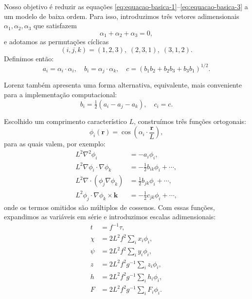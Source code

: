Nosso objetivo é reduzir as equações \eqref{eq:equacao-basica-1}–\eqref{eq:equacao-basica-3} a um modelo de baixa ordem. Para isso, introduzimos três vetores adimensionais $\alpha_1, \alpha_2, \alpha_3$ que satisfazem
\begin{equation*}
	\alpha_1 + \alpha_2 + \alpha_3 = 0,
\end{equation*}
e adotamos as permutações cíclicas
\begin{equation*}
	(i,j,k) = (1,2,3),\; (2,3,1),\; (3,1,2).
\end{equation*}
Definimos então:
\begin{equation*}
	a_i = \alpha_i \cdot \alpha_i, 
	\quad b_i = \alpha_j \cdot \alpha_k, 
	\quad c = (b_1b_2+b_2b_3+b_3b_1)^{1/2}.
\end{equation*}

Lorenz também apresenta uma forma alternativa, equivalente, mais conveniente para a implementação computacional:
\begin{equation*}
	b_i = \tfrac{1}{2}(a_i - a_j - a_k), 
	\quad c_i = c.
\end{equation*}

Escolhido um comprimento característico $L$, construímos três funções ortogonais:
\begin{equation*}
	\phi_i(\mathbf{r}) = \cos\!\left(\alpha_i \cdot \frac{\mathbf{r}}{L}\right),
\end{equation*}
para as quais valem, por exemplo:
\begin{align*}
	L^2\nabla^2\phi_i                              & = -a_i\phi_i,                         \\
	L^2\nabla\phi_i \cdot \nabla\phi_k             & = -\tfrac{1}{2}b_{ik}\phi_i + \cdots, \\
	L^2\nabla \cdot (\phi_j\nabla\phi_k)           & = \tfrac{1}{2}b_{jk}\phi_i + \cdots,  \\
	L^2\phi_j \cdot \nabla\phi_k \times \mathbf{k} & = -\tfrac{1}{2}c_{jk}\phi_i + \cdots, 
\end{align*}
onde os termos omitidos são múltiplos de cossenos. Com essas funções, expandimos as variáveis em série e introduzimos escalas adimensionais:
\begin{equation}\label{eq:ch01-adimensionalizacao}
    \begin{aligned}
    	t    & = f^{-1}\tau,                     \\
    	\chi & = 2L^2f^2 \sum_i x_i\phi_i,       \\
    	\psi & = 2L^2f^2 \sum_i y_i\phi_i,       \\
    	z    & = 2L^2f^2g^{-1} \sum_i z_i\phi_i, \\
    	h    & = 2L^2f^2g^{-1} \sum_i h_i\phi_i, \\
    	F    & = 2L^2f^2g^{-1} \sum_i F_i\phi_i. 
    \end{aligned}
\end{equation}

